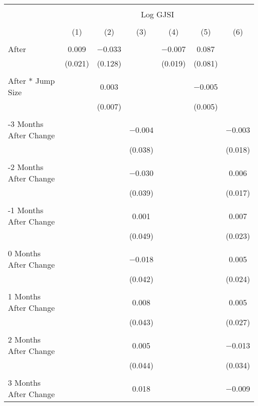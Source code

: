 
\begin{tabular}{@{\extracolsep{5pt}}lcccccc} 
\\[-1.8ex]\hline 
\hline \\[-1.8ex] 
 & \multicolumn{6}{c}{Log GJSI} \\ 
\cline{2-7} 
\\[-1.8ex] & (1) & (2) & (3) & (4) & (5) & (6)\\ 
\hline \\[-1.8ex] 
 After & 0.009 & $-$0.033 &  & $-$0.007 & 0.087 &  \\ 
  & (0.021) & (0.128) &  & (0.019) & (0.081) &  \\ 
  & & & & & & \\ 
 After * Jump Size &  & 0.003 &  &  & $-$0.005 &  \\ 
  &  & (0.007) &  &  & (0.005) &  \\ 
  & & & & & & \\ 
 -3 Months After Change &  &  & $-$0.004 &  &  & $-$0.003 \\ 
  &  &  & (0.038) &  &  & (0.018) \\ 
  & & & & & & \\ 
 -2 Months After Change &  &  & $-$0.030 &  &  & 0.006 \\ 
  &  &  & (0.039) &  &  & (0.017) \\ 
  & & & & & & \\ 
 -1 Months After Change &  &  & 0.001 &  &  & 0.007 \\ 
  &  &  & (0.049) &  &  & (0.023) \\ 
  & & & & & & \\ 
 0 Months After Change &  &  & $-$0.018 &  &  & 0.005 \\ 
  &  &  & (0.042) &  &  & (0.024) \\ 
  & & & & & & \\ 
 1 Months After Change &  &  & 0.008 &  &  & 0.005 \\ 
  &  &  & (0.043) &  &  & (0.027) \\ 
  & & & & & & \\ 
 2 Months After Change &  &  & 0.005 &  &  & $-$0.013 \\ 
  &  &  & (0.044) &  &  & (0.034) \\ 
  & & & & & & \\ 
 3 Months After Change &  &  & 0.018 &  &  & $-$0.009 \\ 

\end{tabular}
